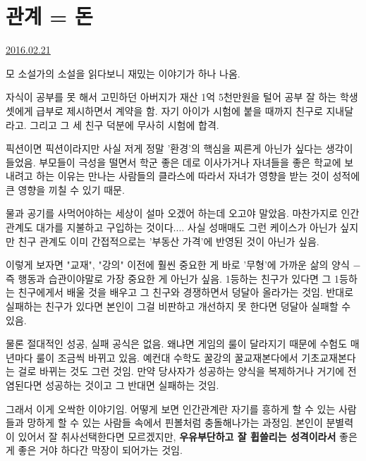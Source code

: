 


\section{관계 = 돈}
\href{https://www.kockoc.com/Apoc/643932}{2016.02.21}

\vspace{5mm}

모 소설가의 소설을 읽다보니 재밌는 이야기가 하나 나옴.
\vspace{5mm}

자식이 공부를 못 해서 고민하던 아버지가 재산 1억 5천만원을 털어
공부 잘 하는 학생 셋에게 급부로 제시하면서 계약을 함.
자기 아이가 시험에 붙을 때까지 친구로 지내달라고. 그리고 그 세 친구 덕분에 무사히 시험에 합격.
\vspace{5mm}

픽션이면 픽션이라지만 사실 저게 정말 '환경'의 핵심을 찌른게 아닌가 싶다는 생각이 들었음.
부모들이 극성을 떨면서 학군 좋은 데로 이사가거나 자녀들을 좋은 학교에 보내려고 하는 이유는
만나는 사람들의 클라스에 따라서 자녀가 영향을 받는 것이 성적에 큰 영향을 끼칠 수 있기 때문.
\vspace{5mm}

물과 공기를 사먹어야하는 세상이 설마 오겠어 하는데 오고야 말았음.
마찬가지로 인간관계도 대가를 지불하고 구입하는 것이다.... 사실 성매매도 그런 케이스가 아닌가 싶지만
친구 관계도 이미 간접적으로는 '부동산 가격'에 반영된 것이 아닌가 싶음.
\vspace{5mm}

이렇게 보자면 "교재", "강의" 이전에 훨씬 중요한 게
바로 '무형'에 가까운 삶의 양식 $-$ 즉 행동과 습관이야말로 가장 중요한 게 아닌가 싶음.
1등하는 친구가 있다면 그 1등하는 친구에게서 배울 것을 배우고 그 친구와 경쟁하면서 덩달아 올라가는 것임.
반대로 실패하는 친구가 있다면 본인이 그걸 비판하고 개선하지 못 한다면 덩달아 실패할 수 있음.
\vspace{5mm}

물론 절대적인 성공, 실패 공식은 없음. 왜냐면 게임의 룰이 달라지기 때문에
수험도 매년마다 룰이 조금씩 바뀌고 있음. 예컨대 수학도 꿀강의 꿀교재본다에서 기초교재본다는 걸로 바뀌는 것도 그런 것임.
만약 당사자가 성공하는 양식을 복제하거나 거기에 전염된다면 성공하는 것이고 그 반대면 실패하는 것임.
\vspace{5mm}

그래서 이게 오싹한 이야기임.
어떻게 보면 인간관계란 자기를 흥하게 할 수 있는 사람들과
망하게 할 수 있는 사람들 속에서 핀볼처럼 충돌해나가는 과정임.
본인이 분별력이 있어서 잘 취사선택한다면 모르겠지만,
\textbf{우유부단하고 잘 휩쓸리는 성격이라서} 좋은 게 좋은 거야 하다간 막장이 되어가는 것임.
\vspace{5mm}


